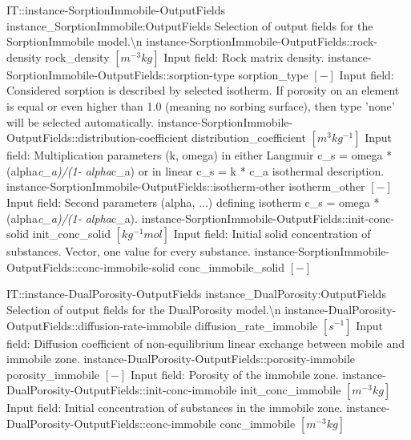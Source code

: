 \begin{SelectionType}
	{IT::instance-SorptionImmobile-OutputFields}
	{instance{\_}SorptionImmobile:OutputFields}
	{{{Selection of output fields for the SorptionImmobile model.{\textbackslash}n}%
}}
		\SelectionItem
			{instance-SorptionImmobile-OutputFields::rock-density}
			{rock{\_}density}
			{{{}{$[m^{-3}kg]$}{ Input field: Rock matrix density.}%
}}
		\SelectionItem
			{instance-SorptionImmobile-OutputFields::sorption-type}
			{sorption{\_}type}
			{{{}{$[-]$}{ Input field: Considered sorption is described by selected isotherm.
If porosity on an element is equal or even higher than 1.0 (meaning no sorbing surface), then type 'none' will be selected automatically.}%
}}
		\SelectionItem
			{instance-SorptionImmobile-OutputFields::distribution-coefficient}
			{distribution{\_}coefficient}
			{{{}{$[m^{3}kg^{-1}]$}{ Input field: Multiplication parameters (k, omega) in either Langmuir c{\_}s = omega * (alpha}\textit{c{\_}a)/(1- alpha}{c{\_}a) or in linear c{\_}s = k * c{\_}a isothermal description.}%
}}
		\SelectionItem
			{instance-SorptionImmobile-OutputFields::isotherm-other}
			{isotherm{\_}other}
			{{{}{$[-]$}{ Input field: Second parameters (alpha, ...) defining isotherm  c{\_}s = omega * (alpha}\textit{c{\_}a)/(1- alpha}{c{\_}a).}%
}}
		\SelectionItem
			{instance-SorptionImmobile-OutputFields::init-conc-solid}
			{init{\_}conc{\_}solid}
			{{{}{$[kg^{-1}mol]$}{ Input field: Initial solid concentration of substances.
Vector, one value for every substance.}%
}}
		\SelectionItem
			{instance-SorptionImmobile-OutputFields::conc-immobile-solid}
			{conc{\_}immobile{\_}solid}
			{{{}{$[-]$}{ }%
}}
\end{SelectionType}
\begin{SelectionType}
	{IT::instance-DualPorosity-OutputFields}
	{instance{\_}DualPorosity:OutputFields}
	{{{Selection of output fields for the DualPorosity model.{\textbackslash}n}%
}}
		\SelectionItem
			{instance-DualPorosity-OutputFields::diffusion-rate-immobile}
			{diffusion{\_}rate{\_}immobile}
			{{{}{$[s^{-1}]$}{ Input field: Diffusion coefficient of non-equilibrium linear exchange between mobile and immobile zone.}%
}}
		\SelectionItem
			{instance-DualPorosity-OutputFields::porosity-immobile}
			{porosity{\_}immobile}
			{{{}{$[-]$}{ Input field: Porosity of the immobile zone.}%
}}
		\SelectionItem
			{instance-DualPorosity-OutputFields::init-conc-immobile}
			{init{\_}conc{\_}immobile}
			{{{}{$[m^{-3}kg]$}{ Input field: Initial concentration of substances in the immobile zone.}%
}}
		\SelectionItem
			{instance-DualPorosity-OutputFields::conc-immobile}
			{conc{\_}immobile}
			{{{}{$[m^{-3}kg]$}{ }%
}}
\end{SelectionType}
